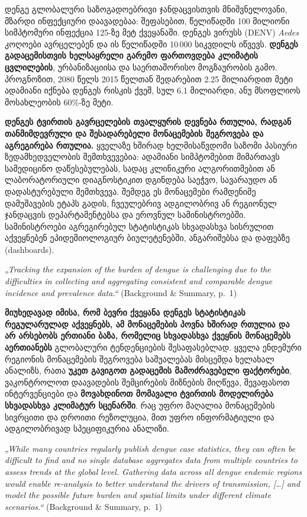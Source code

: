 \documentclass[11pt,a4paper]{article}
\newcommand{\imp}[1]{\textbf{\color{importred}#1}}
\begin{document}
დენგე გლობალური საზოგადოებრივი ჯანდაცვისთვის მნიშვნელოვანი, მზარდი ინფექციური დაავადებაა: შეფასებით, წელიწადში 100 მილიონი
სიმპტომური ინფექცია 125-ზე მეტ ქვეყანაში. დენგეს ვირუსს (DENV) \textit{Aedes} კოღოები ავრცელებენ და ის წელიწადში 10\,000
სიკვდილს იწვევს. \imp{დენგეს გადაცემისთვის ხელსაყრელი გარემო ფართოვდება კლიმატის ცვლილების}, ურბანიზაციისა და საერთაშორისო
მოგზაურობის გამო. პროგნოზით, 2080 წელს 2015 წელთან შედარებით 2.25 მილიარდით მეტი ადამიანი იქნება დენგეს რისკის ქვეშ,
სულ 6.1 მილიარდი, ანუ მსოფლიოს მოსახლეობის 60\%-ზე მეტი.

\imp{დენგეს ტვირთის გავრცელების თვალყურის დევნება რთულია, რადგან თანმიმდევრული და შესადარებელი მონაცემების შეგროვება და
აგრეგირება რთულია.} ყველაზე ხშირად ხელმისაწვდომი საზომი პასიური ზედამხედველობის შემთხვევებია: ადამიანი სიმპტომებით
მიმართავს სამედიცინო დაწესებულებას, სადაც კლინიკური ალგორითმებით ან ლაბორატორიული დიაგნოსტიკით დგინდება საეჭვო, სავარაუდო ან
დადასტურებული შემთხვევა. შემდეგ ეს მონაცემები რამდენიმე დამუშავების ეტაპს გადის, ჩვეულებრივ ადგილობრივ ან რეგიონულ ჯანდაცვის
დეპარტამენტებსა და ეროვნულ სამინისტროებში. სამინისტროები აგრეგირებულ სტატისტიკას სხვადასხვა სისრულით აქვეყნებენ
ეპიდემიოლოგიურ ბიულეტენებში, ანგარიშებსა და დაფებზე (dashboards).

\begin{citat}
\textit{„Tracking the expansion of the burden of dengue is challenging due to the difficulties in collecting and aggregating consistent and comparable dengue incidence and prevalence data.“} (Background \& Summary, p.~1)
\end{citat}

\imp{მიუხედავად იმისა, რომ ბევრი ქვეყანა დენგეს სტატისტიკას რეგულარულად აქვეყნებს, ამ მონაცემების პოვნა ხშირად რთულია და არ
არსებობს ერთიანი ბაზა, რომელიც სხვადასხვა ქვეყნის მონაცემებს აერთიანებს} გლობალური ტენდენციების შესაფასებლად. ყველა ენდემური
რეგიონის მონაცემების შეგროვება საშუალებას მისცემდა ხელახალ ანალიზს, რათა \imp{უკეთ გავიგოთ გადაცემის მამოძრავებელი ფაქტორები},
ვაკონტროლოთ დაავადების შემცირების მიზნების მიღწევა, შევაფასოთ ინტერვენციები და \imp{მოვახდინოთ მომავალი ტვირთის მოდელირება
სხვადასხვა კლიმატურ სცენარში}. რაც უფრო მაღალია მონაცემების სივრცითი და დროითი რეზოლუცია, მით უფრო ინფორმატიული და ადგილობრივად
სპეციფიკურია ანალიზი.

\begin{citat}
\textit{„While many countries regularly publish dengue case statistics, they can often be difficult to find and no single database aggregates data from multiple countries to assess trends at the global level. Gathering data across all dengue endemic regions would enable re-analysis to better understand the drivers of transmission, [\ldots] and model the possible future burden and spatial limits under different climate scenarios.“} (Background \& Summary, p.~1)
\end{citat}
\end{document}
